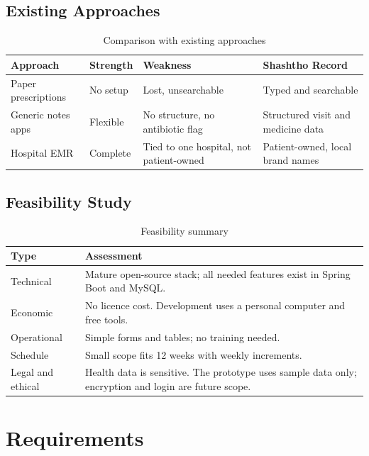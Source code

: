 \documentclass[11pt,a4paper]{article}
\begin{document}
\subsection{Existing Approaches}
\begin{table}[H]
\centering
\caption{Comparison with existing approaches}
\begin{tabularx}{\textwidth}{lYYY}
\toprule
\textbf{Approach} & \textbf{Strength} & \textbf{Weakness} & \textbf{Shashtho Record}\\
\midrule
Paper prescriptions & No setup & Lost, unsearchable & Typed and searchable\\
Generic notes apps & Flexible & No structure, no antibiotic flag & Structured visit and medicine data\\
Hospital EMR & Complete & Tied to one hospital, not patient-owned & Patient-owned, local brand names\\
\bottomrule
\end{tabularx}
\end{table}

\subsection{Feasibility Study}
\begin{table}[H]
\centering
\caption{Feasibility summary}
\begin{tabularx}{\textwidth}{lY}
\toprule
\textbf{Type} & \textbf{Assessment}\\
\midrule
Technical & Mature open-source stack; all needed features exist in Spring Boot and MySQL.\\
Economic & No licence cost. Development uses a personal computer and free tools.\\
Operational & Simple forms and tables; no training needed.\\
Schedule & Small scope fits 12 weeks with weekly increments.\\
Legal and ethical & Health data is sensitive. The prototype uses sample data only; encryption and login are future scope.\\
\bottomrule
\end{tabularx}
\end{table}

\section{Requirements}
\end{document}
